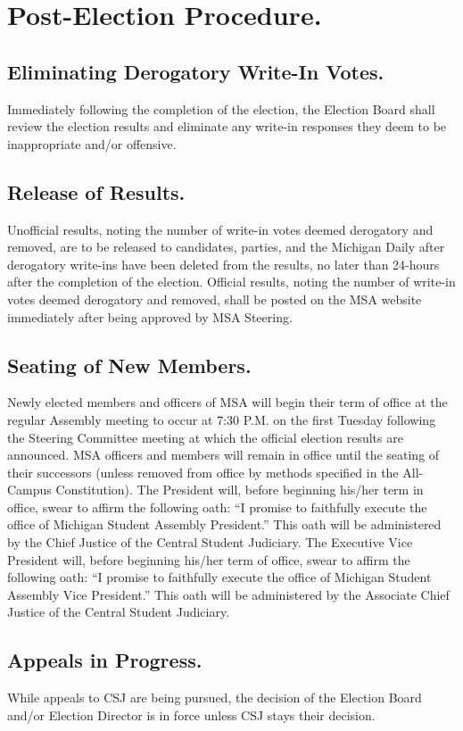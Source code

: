 \section{Post-Election Procedure.}

\subsection{Eliminating Derogatory Write-In Votes.}
Immediately following the completion of the election, the Election Board shall review the election results and eliminate any write-in responses they deem to be inappropriate and/or offensive.

\subsection{Release of Results.}
Unofficial results, noting the number of write-in votes deemed derogatory and removed, are to be released to candidates, parties, and the Michigan Daily after derogatory write-ins have been deleted from the results, no later than 24-hours after the completion of the election. Official results, noting the number of write-in votes deemed derogatory and removed, shall be posted on the MSA website immediately after being approved by MSA Steering.

\subsection{Seating of New Members.}
Newly elected members and officers of MSA will begin their term of office at the regular Assembly meeting to occur at 7:30 P.M. on the first Tuesday following the Steering Committee meeting at which the official election results are announced.  MSA officers and members will remain in office until the seating of their successors (unless removed from office by methods specified in the All-Campus Constitution).  The President will, before beginning his/her term in office, swear to affirm the following oath: ``I promise to faithfully execute the office of Michigan Student Assembly President.''  This oath will be administered by the Chief Justice of the Central Student Judiciary.  The Executive Vice President will, before beginning his/her term of office, swear to affirm the following oath: ``I promise to faithfully execute the office of Michigan Student Assembly Vice President.''  This oath will be administered by the Associate Chief Justice of the Central Student Judiciary.

\subsection{Appeals in Progress.}
While appeals to CSJ are being pursued, the decision of the Election Board and/or Election Director is in force unless CSJ stays their decision.

